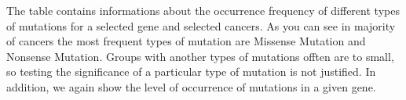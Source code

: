 The table contains informations about the occurrence frequency of
different types of mutations for a selected gene and selected cancers.
As you can see in majority of cancers the most frequent types of
mutation are Missense Mutation and Nonsense Mutation. Groups with
another types of mutations offten are to small, so testing the
significance of a particular type of mutation is not justified. In
addition, we again show the level of occurrence of mutations in a given
gene.

\citep{R}



\address{%
Marlena Bielat, \href{bielat.marlena@gmail.com}{\nolinkurl{bielat.marlena@gmail.com}}\\
Małgorzata Dobkowska, \href{gosia.dobkowska@tlen.pl}{\nolinkurl{gosia.dobkowska@tlen.pl}} \\
Sebastian Gargas, \href{gargass@student.mini.pw.edu.pl}{\nolinkurl{gargass@student.mini.pw.edu.pl}}\\
MiNI Warsaw University of Technology\\
\\
}



